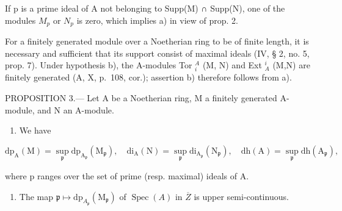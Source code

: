 If p is a prime ideal of A not belonging to Supp(M) ∩ Supp(N), one of the modules \(M_{p}\) or \(N_{p}\) is zero, which implies a) in view of prop. 2.

For a finitely generated module over a Noetherian ring to be of finite length, it is necessary and sufficient that its support consist of maximal ideals (IV, § 2, no. 5, prop. 7). Under hypothesis b), the A-modules Tor \(_{i}^{A}\) (M, N) and Ext \(_{A}^{i}\) (M,N) are finitely generated (A, X, p.~108, cor.); assertion b) therefore follows from a).

PROPOSITION 3.--- Let A be a Noetherian ring, M a finitely generated A-module, and N an A-module.

\begin{enumerate}
\def\labelenumi{\alph{enumi})}
\tightlist
\item
  We have
\end{enumerate}

\[
\mathrm{dp} _ {\mathrm{A}} (\mathrm{M}) = \sup _ {\mathfrak {p}} \mathrm{dp} _ {\mathrm{A} _ {\mathfrak {p}}} \left(\mathrm{M} _ {\mathfrak {p}}\right), \quad \mathrm{di} _ {\mathrm{A}} (\mathrm{N}) = \sup _ {\mathfrak {p}} \mathrm{di} _ {\mathrm{A} _ {\mathfrak {p}}} \left(\mathrm{N} _ {\mathfrak {p}}\right), \quad \mathrm{dh} (\mathrm{A}) = \sup _ {\mathfrak {p}} \mathrm{dh} \left(\mathrm{A} _ {\mathfrak {p}}\right),
\]

where p ranges over the set of prime (resp. maximal) ideals of A.

\begin{enumerate}
\def\labelenumi{\alph{enumi})}
\setcounter{enumi}{1}
\tightlist
\item
  The map \(\mathfrak{p} \mapsto \mathrm{dp}_{A_{\mathfrak{p}}}(\mathrm{M}_{\mathfrak{p}})\) of \(\operatorname{Spec}(A)\) in \(\overline{Z}\) is upper semi-continuous.
\end{enumerate}

